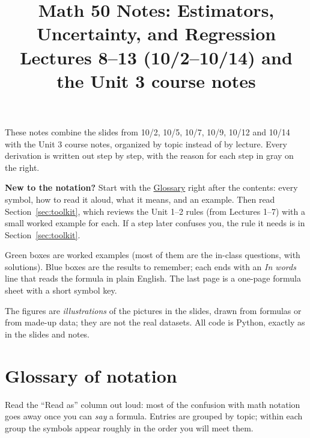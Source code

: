 \documentclass[11pt]{article}
\title{\textbf{Math 50 Notes: Estimators, Uncertainty, and Regression}\\[2pt]
\large Lectures 8--13 (10/2--10/14) and the Unit 3 course notes}
\author{}
\date{}
\begin{document}
\maketitle
\thispagestyle{fancy}

\begin{tipbox}[title={How to use these notes}]
These notes combine the slides from 10/2, 10/5, 10/7, 10/9, 10/12 and 10/14 with the Unit 3 course notes, organized by topic
instead of by lecture. Every derivation is written out step by step, with the reason for each step in gray on the right.

\textbf{New to the notation?} Start with the \hyperref[sec:glossary]{Glossary} right after the contents: every symbol, how to read it
aloud, what it means, and an example. Then read Section~\ref{sec:toolkit}, which reviews the Unit 1--2 rules (from Lectures 1--7) with a
small worked example for each. If a step later confuses you, the rule it needs is in Section~\ref{sec:toolkit}.

Green boxes are worked examples (most of them are the in-class questions, with solutions). Blue boxes are the results to remember; each
ends with an \emph{In words} line that reads the formula in plain English. The last page is a one-page formula sheet with a short symbol key.

The figures are \emph{illustrations} of the pictures in the slides, drawn from formulas or from made-up data; they are not the
real datasets. All code is Python, exactly as in the slides and notes.
\end{tipbox}

\tableofcontents

\clearpage
\section*{Glossary of notation}\label{sec:glossary}
Read the ``Read as'' column out loud: most of the confusion with math notation goes away once you can \emph{say} a formula.
Entries are grouped by topic; within each group the symbols appear roughly in the order you will meet them.
\end{document}
